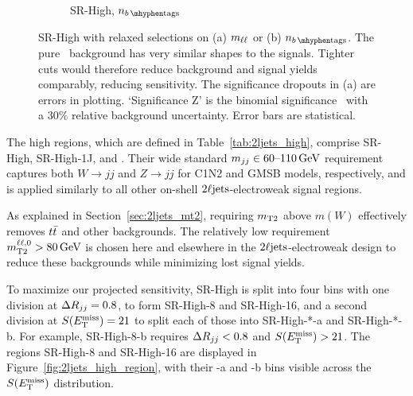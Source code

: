\begin{figure}[tp]
\begin{subfigure}{0.62\textwidth}
\caption{SR-High, $\nbtag$}
\end{subfigure}
\caption[
SR-High with relaxed selections on (a) $\mll$ or (b) $\nbtag$
]{%
SR-High with relaxed selections on (a) $\mll$ or (b) $\nbtag$.
The pure \diboson\ background has very similar shapes to the signals.
Tighter cuts would therefore reduce background and signal yields comparably,
reducing sensitivity.
The significance dropouts in (a) are errors in plotting.
`Significance Z' is the binomial significance~\cite{cousins2008evaluation}
with a $30\%$ relative background uncertainty.
Error bars are statistical.
}
\label{fig:2ljets_high_mll_b}
\end{figure}

The high regions, which are defined in Table~\ref{tab:2ljets_high}, comprise
SR-High, SR-High-1J, and \srllbb.
Their wide standard $\mjj \in 60\textrm{--}110\,\eV[G]$ requirement
captures both $W\to jj$ and $Z\to jj$ for C1N2 and GMSB models,
respectively, and is applied similarly to all other on-shell
$\twoljets$-electroweak signal regions.

As explained in Section~\ref{sec:2ljets_mt2}, requiring $\mttwo$ above $m(W)$
effectively removes $\ttbar$ and other backgrounds.
The relatively low requirement $\mttwoll > 80\,\eV[G]$ is chosen here and
elsewhere in the $\twoljets$-electroweak design to reduce these backgrounds
while minimizing lost signal yields.

To maximize our projected sensitivity, SR-High is split into four bins with
one division at $\rjj = 0.8$, to form SR-High-8 and SR-High-16, and a second
division at $\metsig = 21$ to split each of those into
SR-High-*-a and SR-High-*-b.
For example, SR-High-8-b requires $\rjj < 0.8$ and $\metsig > 21$.
The regions SR-High-8 and SR-High-16 are displayed in
Figure~\ref{fig:2ljets_high_region}, with their -a and -b bins visible across
the $\metsig$ distribution.


